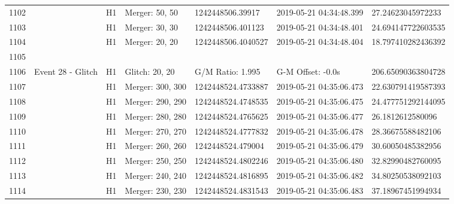 \begin{longtable}{lllllll}
1102 &                                                    &       H1 &    Merger: 50, 50 &    1242448506.39917 &  2019-05-21 04:34:48.399 &   27.24623045972233 \\
1103 &                                                    &       H1 &    Merger: 30, 30 &   1242448506.401123 &  2019-05-21 04:34:48.401 &  24.694147722603535 \\
1104 &                                                    &       H1 &    Merger: 20, 20 &  1242448506.4040527 &  2019-05-21 04:34:48.404 &  18.797410282436392 \\
1105 &                                                    &          &                   &                     &                          &                     \\
1106 &                                  Event 28 - Glitch &       H1 &    Glitch: 20, 20 &    G/M Ratio: 1.995 &        G-M Offset: -0.0s &  206.65090363804728 \\
1107 &                                                    &       H1 &  Merger: 300, 300 &  1242448524.4733887 &  2019-05-21 04:35:06.473 &  22.630791419587393 \\
1108 &                                                    &       H1 &  Merger: 290, 290 &  1242448524.4748535 &  2019-05-21 04:35:06.475 &  24.477751292144095 \\
1109 &                                                    &       H1 &  Merger: 280, 280 &  1242448524.4765625 &  2019-05-21 04:35:06.477 &    26.1812612580096 \\
1110 &                                                    &       H1 &  Merger: 270, 270 &  1242448524.4777832 &  2019-05-21 04:35:06.478 &   28.36675588482106 \\
1111 &                                                    &       H1 &  Merger: 260, 260 &   1242448524.479004 &  2019-05-21 04:35:06.479 &   30.60050485382956 \\
1112 &                                                    &       H1 &  Merger: 250, 250 &  1242448524.4802246 &  2019-05-21 04:35:06.480 &   32.82990482760095 \\
1113 &                                                    &       H1 &  Merger: 240, 240 &  1242448524.4816895 &  2019-05-21 04:35:06.482 &   34.80250538092103 \\
1114 &                                                    &       H1 &  Merger: 230, 230 &  1242448524.4831543 &  2019-05-21 04:35:06.483 &   37.18967451994934 \\

\end{longtable}
